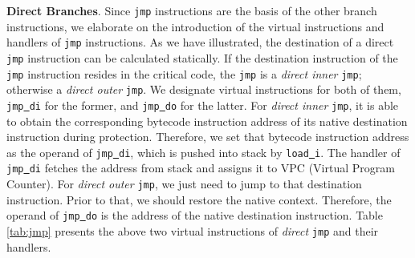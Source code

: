 \begin{table}[h]
\renewcommand{\arraystretch}{1.0}
\begin{tabnote}
\end{tabnote}
\end{table}


\textbf{Direct Branches}. Since \texttt{jmp} instructions are the basis of the other branch instructions, we elaborate on the introduction of the virtual instructions and handlers of \texttt{jmp} instructions. As we have illustrated, the destination of a direct \texttt{jmp} instruction can be calculated statically. If the destination instruction of the \texttt{jmp} instruction resides in the critical code, the \texttt{jmp} is a \textit{direct inner} \texttt{jmp}; otherwise a \textit{direct outer} \texttt{jmp}. We designate virtual instructions for both of them, \texttt{jmp\underline{ }di} for the former, and \texttt{jmp\underline{ }do} for the latter. For \textit{direct inner} \texttt{jmp}, it is able to obtain the corresponding bytecode instruction address of its native destination instruction during protection. Therefore, we set that bytecode instruction address as the operand of \texttt{jmp\underline{ }di}, which is pushed into stack by \texttt{load\underline{ }i}. The handler of \texttt{jmp\underline{ }di} fetches the address from stack and assigns it to VPC (Virtual Program Counter). For \textit{direct outer} \texttt{jmp}, we just need to jump to that destination instruction. Prior to that, we should restore the native context. Therefore, the operand of \texttt{jmp\underline{ }do} is the address of the native destination instruction. Table \ref{tab:jmp} presents the above two virtual instructions of \textit{direct} \texttt{jmp} and their handlers.

